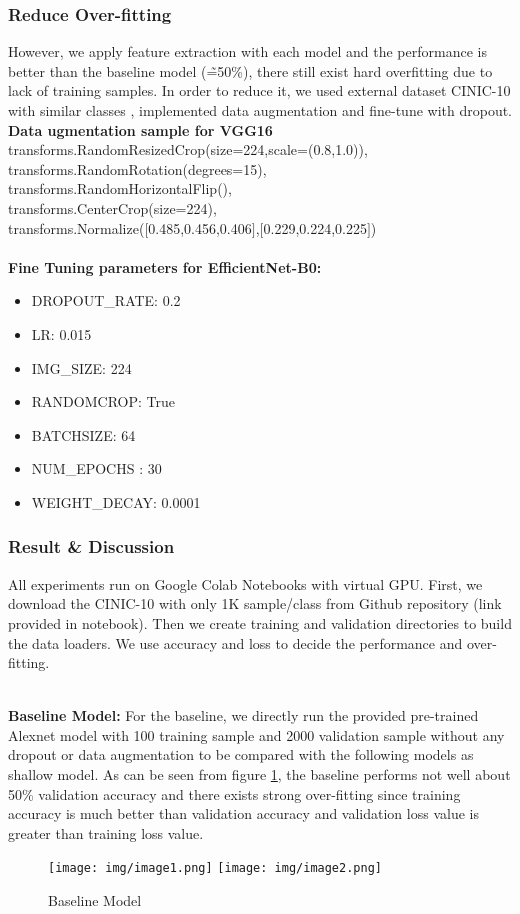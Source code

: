 \documentclass[10pt,twocolumn,letterpaper]{article}
\begin{document}
\subsubsection{Reduce Over-fitting}
However, we apply feature extraction with each model and the performance is better than the baseline model (\~=50\%), there still exist hard overfitting due to lack of training samples. In order to reduce it, we used external dataset CINIC-10 with similar classes , implemented data augmentation and fine-tune with dropout.
\\\textbf{Data ugmentation sample for VGG16}\\
transforms.RandomResizedCrop(size=224,scale=(0.8,1.0)),\\
transforms.RandomRotation(degrees=15),\\
transforms.RandomHorizontalFlip(),\\
transforms.CenterCrop(size=224),\\
transforms.Normalize($[$0.485,0.456,0.406$]$,\newline$[$0.229,0.224,0.225$]$)
\\\\\textbf{Fine Tuning parameters for EfficientNet-B0:}
\begin{itemize}
\item DROPOUT\_RATE: 0.2
\item LR: 0.015
\item IMG\_SIZE: 224
\item RANDOMCROP: True
\item BATCHSIZE: 64
\item NUM\_EPOCHS : 30
\item WEIGHT\_DECAY: 0.0001
\end{itemize}

\subsubsection{Result & Discussion}
All experiments run on Google Colab Notebooks with virtual GPU. First, we download the CINIC-10 with only 1K sample/class from Github repository (link provided in notebook). Then we create training and validation directories to build the data loaders. We use accuracy and loss to decide the performance and over-fitting.

\\\textbf{Baseline Model:}
For the baseline, we directly run the provided pre-trained Alexnet model with 100 training sample and 2000 validation sample without any dropout or data augmentation to be compared with the following models as shallow model.
As can be seen from figure \ref{fig_base_model}, the baseline performs not well about 50\% validation accuracy and there exists strong over-fitting since training accuracy is much better than validation accuracy and validation loss value is greater than training loss value.
\begin{figure}[h]

\centering
\texttt{[image: img/image1.png]}
\texttt{[image: img/image2.png]}
\caption{ Baseline Model \label{fig_base_model}}
\end{figure}
\end{document}
